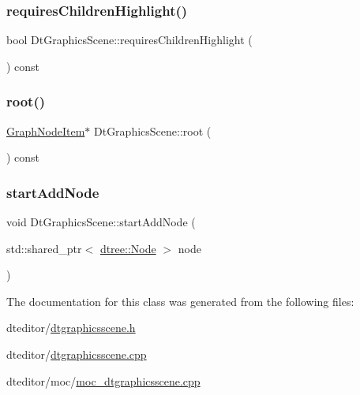 \mbox{\label{class_dt_graphics_scene_a9242cd023eace508f093bc15adbc236b}} 
\subsubsection{\texorpdfstring{requiresChildrenHighlight()}{requiresChildrenHighlight()}}
{\footnotesize\ttfamily bool Dt\+Graphics\+Scene\+::requires\+Children\+Highlight (\begin{DoxyParamCaption}{ }\end{DoxyParamCaption}) const}

\mbox{\label{class_dt_graphics_scene_a5f716cbdd6ce35d0e8bf5e46c2119795}} 
\subsubsection{\texorpdfstring{root()}{root()}}
{\footnotesize\ttfamily \mbox{\hyperlink{class_graph_node_item}{Graph\+Node\+Item}}$\ast$ Dt\+Graphics\+Scene\+::root (\begin{DoxyParamCaption}{ }\end{DoxyParamCaption}) const\hspace{0.3cm}{\ttfamily [inline]}}

\mbox{\label{class_dt_graphics_scene_ad5ebd850cf2cfd9b79230ea34ac7f9b3}} 
\subsubsection{\texorpdfstring{startAddNode}{startAddNode}}
{\footnotesize\ttfamily void Dt\+Graphics\+Scene\+::start\+Add\+Node (\begin{DoxyParamCaption}\item[{std\+::shared\+\_\+ptr$<$ \mbox{\hyperlink{classdtree_1_1_node}{dtree\+::\+Node}} $>$}]{node }\end{DoxyParamCaption})\hspace{0.3cm}{\ttfamily [slot]}}



The documentation for this class was generated from the following files\+:\begin{DoxyCompactItemize}
\item 
dteditor/\mbox{\hyperlink{dtgraphicsscene_8h}{dtgraphicsscene.\+h}}\item 
dteditor/\mbox{\hyperlink{dtgraphicsscene_8cpp}{dtgraphicsscene.\+cpp}}\item 
dteditor/moc/\mbox{\hyperlink{moc__dtgraphicsscene_8cpp}{moc\+\_\+dtgraphicsscene.\+cpp}}\end{DoxyCompactItemize}

